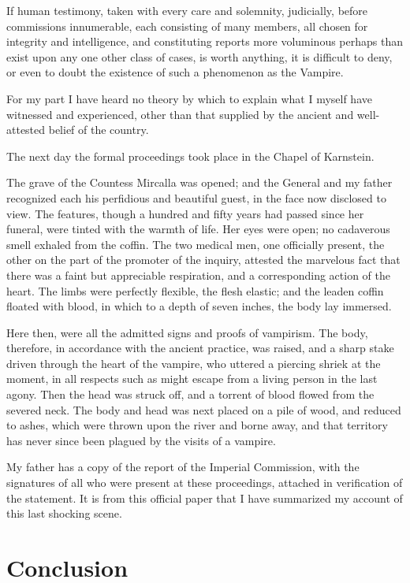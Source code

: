 \documentclass[11pt,twoside,makeidx,hidelinks,]{memoir}
\begin{document}
If human testimony, taken with every care and solemnity, judicially,
before commissions innumerable, each consisting of many members, all
chosen for integrity and intelligence, and constituting reports more
voluminous perhaps than exist upon any one other class of cases, is
worth anything, it is difficult to deny, or even to doubt the existence
of such a phenomenon as the Vampire.

For my part I have heard no theory by which to explain what I myself
have witnessed and experienced, other than that supplied by the ancient
and well-attested belief of the country.

The next day the formal proceedings took place in the Chapel of
Karnstein.

The grave of the Countess Mircalla was opened; and the General and my
father recognized each his perfidious and beautiful guest, in the face
now disclosed to view. The features, though a hundred and fifty years
had passed since her funeral, were tinted with the warmth of life. Her
eyes were open; no cadaverous smell exhaled from the coffin. The two
medical men, one officially present, the other on the part of the
promoter of the inquiry, attested the marvelous fact that there was a
faint but appreciable respiration, and a corresponding action of the
heart. The limbs were perfectly flexible, the flesh elastic; and the
leaden coffin floated with blood, in which to a depth of seven inches,
the body lay immersed.

Here then, were all the admitted signs and proofs of vampirism. The
body, therefore, in accordance with the ancient practice, was raised,
and a sharp stake driven through the heart of the vampire, who uttered a
piercing shriek at the moment, in all respects such as might escape from
a living person in the last agony. Then the head was struck off, and a
torrent of blood flowed from the severed neck. The body and head was
next placed on a pile of wood, and reduced to ashes, which were thrown
upon the river and borne away, and that territory has never since been
plagued by the visits of a vampire.

My father has a copy of the report of the Imperial Commission, with the
signatures of all who were present at these proceedings, attached in
verification of the statement. It is from this official paper that I
have summarized my account of this last shocking scene.

\pbreak{}

\chapter{Conclusion}\hypertarget{conclusion}{}\label{conclusion}
\end{document}
